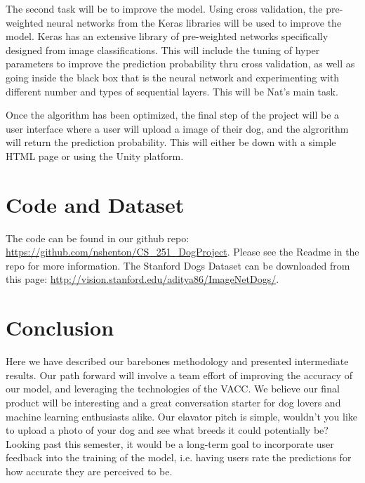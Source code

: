 \documentclass[12pt]{article}
\newcommand{\todo}[1]{\noindent\textcolor{blue}{{$\Box$ #1}}}
\begin{document}
The second task will be to improve the model.  Using cross validation, the pre-weighted neural networks from the Keras libraries will be used to improve the model. Keras has an extensive library of pre-weighted networks specifically designed from image classifications.   This will include the tuning of hyper parameters to improve the prediction probability thru cross validation, as well as going inside the black box that is the neural network and experimenting with different number and types of sequential layers.  This will be Nat's main task.  

Once the algorithm has been optimized, the final step of the project will be a user interface where a user will upload a image of their dog, and the algrorithm will return the prediction probability.  This will either be down with a simple HTML page or using the Unity platform. 


\section{Code and Dataset}

The code can be found in our github repo: \url{https://github.com/nshenton/CS_251_DogProject}.  Please see the Readme in the repo for more information.  The Stanford Dogs Dataset can be downloaded from this page: \url{http://vision.stanford.edu/aditya86/ImageNetDogs/}.

\section{Conclusion}

Here we have described our barebones methodology and presented intermediate results. Our path forward will involve a team effort of improving the accuracy of our model, and leveraging the technologies of the VACC. We believe our final product will be interesting and a great conversation starter for dog lovers and machine learning enthusiasts alike. Our elavator pitch is simple, wouldn't you like to upload a photo of your dog and see what breeds it could potentially be? Looking past this semester, it would be a long-term goal to incorporate user feedback into the training of the model, i.e. having users rate the predictions for how accurate they are perceived to be. 

{}

\end{document}
